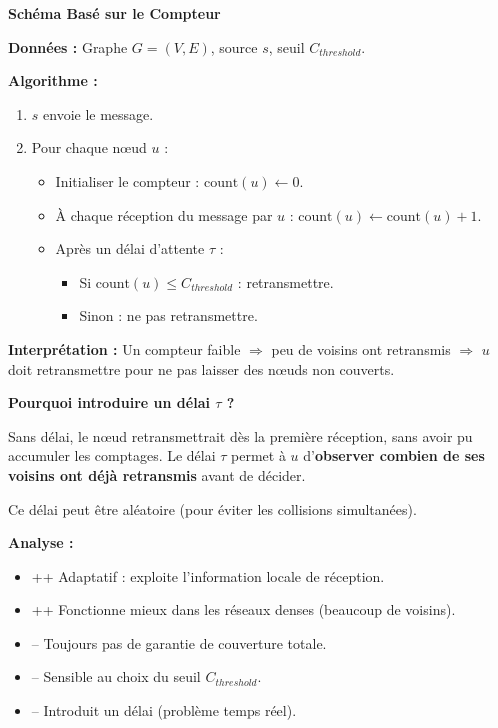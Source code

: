 \documentclass[12pt,a4paper]{article}
\begin{document}
\begin{algorithme}
\textbf{Schéma Basé sur le Compteur}

\textbf{Données :} Graphe $G = (V, E)$, source $s$, seuil $C_{threshold}$.

\textbf{Algorithme :}
\begin{enumerate}
    \item $s$ envoie le message.
    \item Pour chaque nœud $u$ :
    \begin{itemize}
        \item Initialiser le compteur : $\text{count}(u) \leftarrow 0$.
        \item À chaque réception du message par $u$ : $\text{count}(u) \leftarrow \text{count}(u) + 1$.
        \item Après un délai d'attente $\tau$ :
        \begin{itemize}
            \item Si $\text{count}(u) \leq C_{threshold}$ : retransmettre.
            \item Sinon : ne pas retransmettre.
        \end{itemize}
    \end{itemize}
\end{enumerate}

\textbf{Interprétation :} Un compteur faible $\Rightarrow$ peu de voisins ont retransmis $\Rightarrow$
$u$ doit retransmettre pour ne pas laisser des nœuds non couverts.
\end{algorithme}

\begin{notecours}
\textbf{Pourquoi introduire un délai $\tau$ ?}

Sans délai, le nœud retransmettrait dès la première réception, sans avoir pu accumuler les
comptages. Le délai $\tau$ permet à $u$ d'\textbf{observer combien de ses voisins ont déjà
retransmis} avant de décider.

Ce délai peut être aléatoire (pour éviter les collisions simultanées).
\end{notecours}

\begin{important}
\textbf{Analyse :}

\begin{itemize}
    \item \textcolor{defvert}{++} Adaptatif : exploite l'information locale de réception.
    \item \textcolor{defvert}{++} Fonctionne mieux dans les réseaux denses (beaucoup de voisins).
    \item \textcolor{importantrouge}{--} Toujours pas de garantie de couverture totale.
    \item \textcolor{importantrouge}{--} Sensible au choix du seuil $C_{threshold}$.
    \item \textcolor{importantrouge}{--} Introduit un délai (problème temps réel).
\end{itemize}
\end{important}
\end{document}
